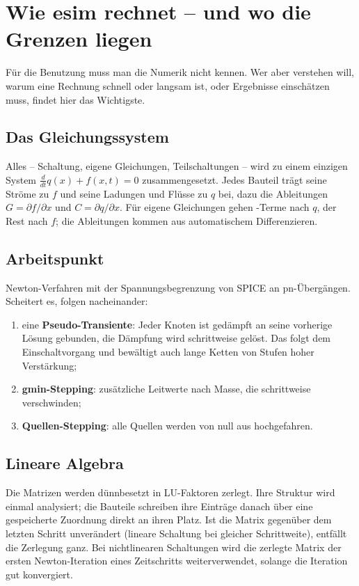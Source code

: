 \chapter{Wie esim rechnet – und wo die Grenzen liegen}
\label{kap:numerik}

Für die Benutzung muss man die Numerik nicht kennen. Wer aber verstehen
will, warum eine Rechnung schnell oder langsam ist, oder Ergebnisse
einschätzen muss, findet hier das Wichtigste.

\section{Das Gleichungssystem}

Alles – Schaltung, eigene Gleichungen, Teilschaltungen – wird zu einem
einzigen System $\frac{d}{dt}q(x) + f(x,t) = 0$ zusammengesetzt. Jedes
Bauteil trägt seine Ströme zu $f$ und seine Ladungen und Flüsse zu $q$ bei,
dazu die Ableitungen $G = \partial f/\partial x$ und
$C = \partial q/\partial x$. Für eigene Gleichungen gehen
-Terme nach $q$, der Rest nach $f$; die Ableitungen kommen
aus automatischem Differenzieren.

\section{Arbeitspunkt}

Newton-Verfahren mit der Spannungsbegrenzung von SPICE an pn-Übergängen.
Scheitert es, folgen nacheinander:

\begin{enumerate}
  \item eine \textbf{Pseudo-Transiente}: Jeder Knoten ist gedämpft an seine
    vorherige Lösung gebunden, die Dämpfung wird schrittweise gelöst. Das
    folgt dem Einschaltvorgang und bewältigt auch lange Ketten von Stufen
    hoher Verstärkung;
  \item \textbf{gmin-Stepping}: zusätzliche Leitwerte nach Masse, die
    schrittweise verschwinden;
  \item \textbf{Quellen-Stepping}: alle Quellen werden von null aus
    hochgefahren.
\end{enumerate}

\section{Lineare Algebra}

Die Matrizen werden dünnbesetzt in LU-Faktoren zerlegt. Ihre Struktur wird
einmal analysiert; die Bauteile schreiben ihre Einträge danach über eine
gespeicherte Zuordnung direkt an ihren Platz. Ist die Matrix gegenüber dem
letzten Schritt unverändert (lineare Schaltung bei gleicher Schrittweite),
entfällt die Zerlegung ganz. Bei nichtlinearen Schaltungen wird die
zerlegte Matrix der ersten Newton-Iteration eines Zeitschritts
weiterverwendet, solange die Iteration gut konvergiert.

